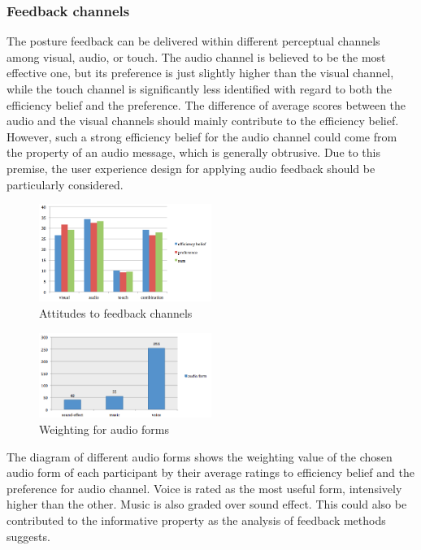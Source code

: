 \subsubsection{Feedback channels}
The posture feedback can be delivered within different perceptual channels among visual, audio, or touch. The audio channel is believed to be the most effective one, but its preference is just slightly higher than the visual channel, while the touch channel is significantly less identified with regard to both the efficiency belief and the preference. The difference of average scores between the audio and the visual channels should mainly contribute to the efficiency belief. However, such a strong efficiency belief for the audio channel could come from the property of an audio message, which is generally obtrusive. Due to this premise, the user experience design for applying audio feedback should be particularly considered.

\begin{figure}[h]
\centering
  \includegraphics[width=0.5\textwidth]{figs/channels}
\caption{Attitudes to feedback channels}
\end{figure}

\begin{figure}[h]
\centering
  \includegraphics[width=0.5\textwidth]{figs/audioform}
\caption{Weighting for audio forms}
\end{figure}

The diagram of different audio forms shows the weighting value of the chosen audio form of each participant by their average ratings to efficiency belief and the preference for audio channel. Voice is rated as the most useful form, intensively higher than the other. Music is also graded over sound effect. This could also be contributed to the informative property as the analysis of feedback methods suggests.


